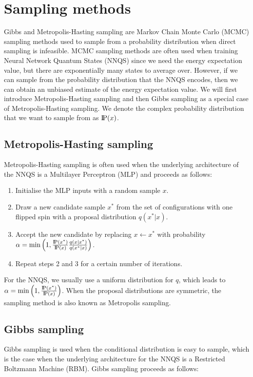 \section{Sampling methods}\label{samplingmethods}
Gibbs and Metropolis-Hasting sampling are Markov Chain Monte Carlo (MCMC) sampling methods used to sample from a probability distribution when direct sampling is infeasible. MCMC sampling methods are often used when training Neural Network Quantum States (NNQS) since we need the energy expectation value, but there are exponentially many states to average over. However, if we can sample from the probability distribution that the NNQS encodes, then we can obtain an unbiased estimate of the energy expectation value. We will first introduce Metropolis-Hasting sampling and then Gibbs sampling as a special case of Metropolis-Hasting sampling. We denote the complex probability distribution that we want to sample from as $\text{I\kern-0.15em P}(x)$.

\subsection*{Metropolis-Hasting sampling}
Metropolis-Hasting sampling \cite{metropolissampling} is often used when the underlying architecture of the NNQS is a Multilayer Perceptron (MLP) and proceeds as follows:
\begin{enumerate}
    \item Initialise the MLP inputs with a random sample $x$.
    \item Draw a new candidate sample $x^*$ from the set of configurations with one flipped spin with a proposal distribution $q(x^*|x)$.
    \item Accept the new candidate by replacing $x \leftarrow x^*$ with probability $\alpha = \min \left(1, \frac{\text{I\kern-0.15em P}(x^*)}{\text{I\kern-0.15em P}(x)} \frac{q(x|x^*)}{q(x^*|x)}\right)$.
    \item Repeat steps 2 and 3 for a certain number of iterations.
\end{enumerate}
For the NNQS, we usually use a uniform distribution for $q$, which leads to $\alpha = \min \left(1, \frac{\text{I\kern-0.15em P}(x^*)}{\text{I\kern-0.15em P}(x)} \right)$. When the proposal distributions are symmetric, the sampling method is also known as Metropolis sampling.
\subsection*{Gibbs sampling}
Gibbs sampling \cite{gibbssampling} is used when the conditional distribution is easy to sample, which is the case when the underlying architecture for the NNQS is a Restricted Boltzmann Machine (RBM). Gibbs sampling proceeds as follows:


